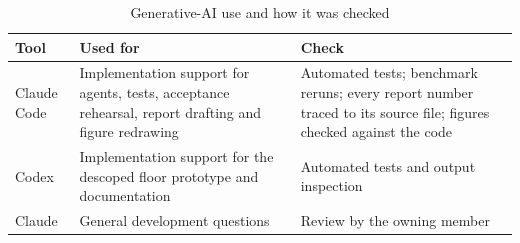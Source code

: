 \begin{table}[H]
\centering
\caption{Generative-AI use and how it was checked}\label{tab:ai-use}
\begin{tabular}{P{0.15\textwidth}P{0.4\textwidth}P{0.37\textwidth}}
\toprule
Tool & Used for & Check\\
\midrule
Claude Code & Implementation support for agents, tests, acceptance rehearsal, report drafting and figure redrawing & Automated tests; benchmark reruns; every report number traced to its source file; figures checked against the code\\
Codex & Implementation support for the descoped floor prototype and documentation & Automated tests and output inspection\\
Claude & General development questions & Review by the owning member\\
\bottomrule
\end{tabular}
\end{table}
